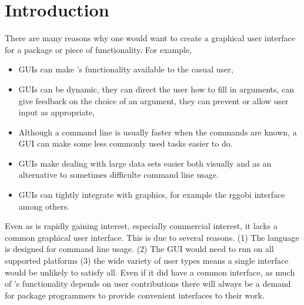 



\section{Introduction}
\label{sec:GUI:introduction}
There are many reasons why one would want to create a graphical user
interface for a package or piece of \R\/ functionality. For example,

\begin{itemize}
\item GUIs can make \R's functionality available to the casual \R\/ user,
\item GUIs can be dynamic, they can direct the user how to fill in
  arguments, can give feedback on the choice of an argument, they can
  prevent or allow user input as appropriate,
\item Although a command line is usually faster when the commands are
  known, a GUI can make some less commonly used tasks easier to do.
\item GUIs make dealing with large data sets easier both visually and
  as an alternative to sometimes difficulte command line usage.
\item GUIs can tightly integrate with graphics, for example the
  rggobi interface among others.
\end{itemize}

Even as \R\/ is rapidly gaining interest, especially commercial
interest, it lacks a common graphical user interface. This is due to
several reasons. (1) The \R\/ language is designed for command line
usage. (2) The GUI would need to run on all supported \R\/ platforms
(3) the wide variety of user types means a single interface would be
unlikely to satisfy all. Even if it did have a common interface, as
much of \R's functionality depends on user contributions there will
always be a demand for package programmers to provide convenient
interfaces to their work.



